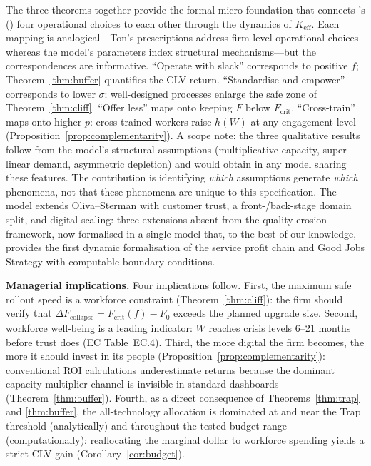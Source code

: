 \documentclass[msom,dblanonrev]{informs4}
\newcommand{\Keff}{K_{\mathrm{eff}}}
\begin{document}
The three theorems together provide the formal micro-foundation that connects \citeauthor{ton2014good}'s (\citeyear{ton2014good}) four operational choices to each other through the dynamics of $\Keff$. Each mapping is analogical---Ton's prescriptions address firm-level operational choices whereas the model's parameters index structural mechanisms---but the correspondences are informative. ``Operate with slack'' corresponds to positive $f$; Theorem~\ref{thm:buffer} quantifies the CLV return. ``Standardise and empower'' corresponds to lower $\sigma$; well-designed processes enlarge the safe zone of Theorem~\ref{thm:cliff}. ``Offer less'' maps onto keeping $F$ below $F_{\mathrm{crit}}$. ``Cross-train'' maps onto higher $p$: cross-trained workers raise $h(W)$ at any engagement level (Proposition~\ref{prop:complementarity}). A scope note: the three qualitative results follow from the model's structural assumptions (multiplicative capacity, super-linear demand, asymmetric depletion) and would obtain in any model sharing these features. The contribution is identifying \emph{which} assumptions generate \emph{which} phenomena, not that these phenomena are unique to this specification. The model extends Oliva--Sterman with customer trust, a front-/back-stage domain split, and digital scaling: three extensions absent from the quality-erosion framework, now formalised in a single model that, to the best of our knowledge, provides the first dynamic formalisation of the service profit chain \citep{heskett1994putting, heskett1997service} and Good Jobs Strategy \citep{ton2014good} with computable boundary conditions.

\medskip
\noindent\textbf{Managerial implications.} Four implications follow. First, the maximum safe rollout speed is a workforce constraint (Theorem~\ref{thm:cliff}): the firm should verify that $\Delta F_{\mathrm{collapse}} = F_{\mathrm{crit}}(f) - F_0$ exceeds the planned upgrade size. Second, workforce well-being is a leading indicator: $W$ reaches crisis levels 6--21 months before trust does (EC Table~EC.4). Third, the more digital the firm becomes, the more it should invest in its people (Proposition~\ref{prop:complementarity}): conventional ROI calculations underestimate returns because the dominant capacity-multiplier channel is invisible in standard dashboards (Theorem~\ref{thm:buffer}). Fourth, as a direct consequence of Theorems~\ref{thm:trap} and \ref{thm:buffer}, the all-technology allocation is dominated at and near the Trap threshold (analytically) and throughout the tested budget range (computationally): reallocating the marginal dollar to workforce spending yields a strict CLV gain (Corollary~\ref{cor:budget}).
\end{document}
